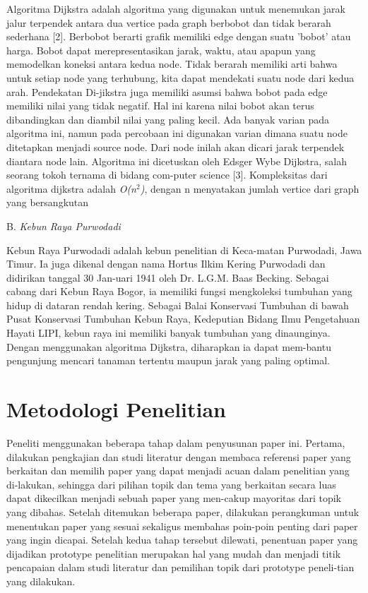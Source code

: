 \documentclass[conference]{IEEEtran}
\begin{document}
Algoritma Dijkstra adalah algoritma yang digunakan untuk
menemukan jarak jalur terpendek antara dua vertice pada
graph berbobot dan tidak berarah sederhana [2]. Berbobot
berarti grafik memiliki edge dengan suatu 'bobot' atau harga.
Bobot dapat merepresentasikan jarak, waktu, atau apapun
yang memodelkan koneksi antara kedua node. Tidak berarah
memiliki arti bahwa untuk setiap node yang terhubung, kita
dapat mendekati suatu node dari kedua arah. Pendekatan Di-jikstra juga memiliki asumsi bahwa bobot pada edge memiliki
nilai yang tidak negatif. Hal ini karena nilai bobot akan
terus dibandingkan dan diambil nilai yang paling kecil. Ada
banyak varian pada algoritma ini, namun pada percobaan
ini digunakan varian dimana suatu node ditetapkan menjadi
source node. Dari node inilah akan dicari jarak terpendek
diantara node lain. Algoritma ini dicetuskan oleh Edsger
Wybe Dijkstra, salah seorang tokoh ternama di bidang com-puter science [3]. Kompleksitas dari algoritma dijkstra adalah
\textit{O(n$^2$)}, dengan n menyatakan jumlah vertice dari graph yang
bersangkutan

B. \textit{Kebun Raya Purwodadi}

Kebun Raya Purwodadi adalah kebun penelitian di Keca-matan Purwodadi, Jawa Timur. Ia juga dikenal dengan nama
Hortus Ilkim Kering Purwodadi dan didirikan tanggal 30 Jan-uari 1941 oleh Dr. L.G.M. Baas Becking. Sebagai cabang dari
Kebun Raya Bogor, ia memiliki fungsi mengkoleksi tumbuhan
yang hidup di dataran rendah kering. Sebagai Balai Konservasi
Tumbuhan di bawah Pusat Konservasi Tumbuhan Kebun Raya,
Kedeputian Bidang Ilmu Pengetahuan Hayati LIPI, kebun raya
ini memiliki banyak tumbuhan yang dinaunginya. Dengan
menggunakan algoritma Dijkstra, diharapkan ia dapat mem-bantu pengunjung mencari tanaman tertentu maupun jarak
yang paling optimal.


\section{Metodologi Penelitian}
Peneliti menggunakan beberapa tahap dalam penyusunan
paper ini. Pertama, dilakukan pengkajian dan studi literatur
dengan membaca referensi paper yang berkaitan dan memilih
paper yang dapat menjadi acuan dalam penelitian yang di-lakukan, sehingga dari pilihan topik dan tema yang berkaitan
secara luas dapat dikecilkan menjadi sebuah paper yang men-cakup mayoritas dari topik yang dibahas. Setelah ditemukan
beberapa paper, dilakukan perangkuman untuk menentukan
paper yang sesuai sekaligus membahas poin-poin penting
dari paper yang ingin dicapai. Setelah kedua tahap tersebut
dilewati, penentuan paper yang dijadikan prototype penelitian
merupakan hal yang mudah dan menjadi titik pencapaian
dalam studi literatur dan pemilihan topik dari prototype peneli-tian yang dilakukan.
\end{document}
